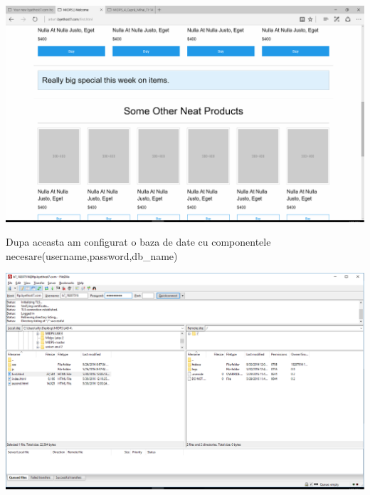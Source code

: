 \begin{flushleft}
\includegraphics[scale=0.5]{images/3}
\end{flushleft}
Dupa aceasta am configurat o baza de date cu componentele necesare(username,password,db\_name)  

\begin{center}
\includegraphics[scale=0.6]{images/4}
\end{center}
\clearpage